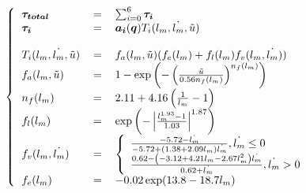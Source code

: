\documentclass[pdftex,a4paper,11pt]{report}
\newcommand{\vs}[1]{\boldsymbol{#1}} %
\numberwithin{equation}{subsection}
\begin{document}
\[
\left\{
\begin{tabular}{lcl}
    $\vs{\tau_{total}}$ & = & $\sum_{i = 0}^{6} \vs{\tau_i}$ \\
    $\vs{\tau_i}$ & = & $\vs{a_i}(\vs{q}) T_i(l_m, \dot{l_m}, \tilde{u})$ \\
    \\
    $T_i(l_m, \dot{l_m}, \tilde{u})$ & = & $f_a(l_m, \tilde{u})(f_e(l_m) + f_l(l_m) f_v(l_m, \dot{l_m}))$ \\
    $f_a(l_m, \tilde{u})$          & = & $1 - \exp \left(- \left(\frac{\tilde{u}}{0.56 n_f(l_m)}\right)^{n_f(l_m)}\right)$ \\
    $n_f(l_m)$                     & = & $2.11 + 4.16 \left(\frac{1}{l_m} - 1\right)$ \\
    $f_l(l_m)$                     & = & $\exp \left(-\left|\frac{l_m^{1.93} - 1}{1.03}\right|^{1.87}\right)$ \\
    $f_v(l_m, \dot{l_m})$          & = & 
        $\left\{ 
        \begin{array}{l}
            \frac{-5.72 - \dot{l_m}}{-5.72 + (1.38 + 2.09 l_m) \dot{l_m}}, \dot{l_m} \leq 0 \\
            \frac{0.62 - \left(-3.12 + 4.21 l_m - 2.67 l_m^2\right) \dot{l_m}}{0.62 + \dot{l_m}}, \dot{l_m} > 0 \\
        \end{array}
        \right.$ \\
    $f_e(l_m)$                     & = & $-0.02 \exp(13.8 - 18.7 l_m)$ \\
\end{tabular}
\right.
\]

\begin{figure}[h]
    \centering
    ~~~
    ~~~
\end{figure}
\end{document}
